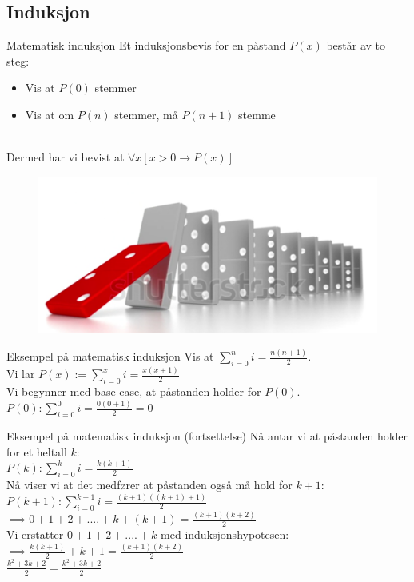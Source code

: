 \subsection{Induksjon}
\begin{frame}{Matematisk induksjon}
    Et induksjonsbevis for en påstand $P(x)$ består av to steg:\\
    \begin{itemize}
        \item Vis at $P(0)$ stemmer
        \item Vis at om $P(n)$ stemmer, må $P(n+1)$ stemme
    \end{itemize}\\
    Dermed har vi bevist at $\forall x [ x > 0 \rightarrow P(x)]$
    
    \begin{figure}
        \centering
        \includegraphics[scale=0.1]{domino.PNG}
        \label{fig:my_label}
    \end{figure}
\end{frame}

\begin{frame}{Eksempel på matematisk induksjon}
    Vis at $\sum_{i=0}^{n} i = \frac{n(n+1)}{2}$.\\
\pause    
    Vi lar $P(x) := \sum_{i=0}^{x} i = \frac{x(x+1)}{2}$\\
    Vi begynner med base case, at påstanden holder for $P(0)$.\\
    $P(0): \sum_{i=0}^{0} i = \frac{0(0+1)}{2} = 0$ \checkmark\\
\end{frame}

\begin{frame}{Eksempel på matematisk induksjon (fortsettelse)}
     Nå antar vi at påstanden holder for et heltall $k$: \\
    $P(k): \sum_{i=0}^{k} i = \frac{k(k+1)}{2}$\\
    Nå viser vi at det medfører at påstanden også må hold for $k+1$:\\
    $P(k+1): \sum_{i=0}^{k+1} i = \frac{(k+1)((k+1)+1)}{2}$\\
    $\implies 0 + 1 + 2 + .... + k + (k+1) = \frac{(k+1)(k+2)}{2}$\\
    
    Vi erstatter $0 + 1 + 2 + .... + k$ med induksjonshypotesen:\\
    $\implies \frac{k(k+1)}{2} + k + 1 = \frac{(k+1)(k+2)}{2}$\\
    $\frac{k^2 + 3k + 2}{2} = \frac{k^2+3k+2}{2}$ \checkmark
\end{frame}

